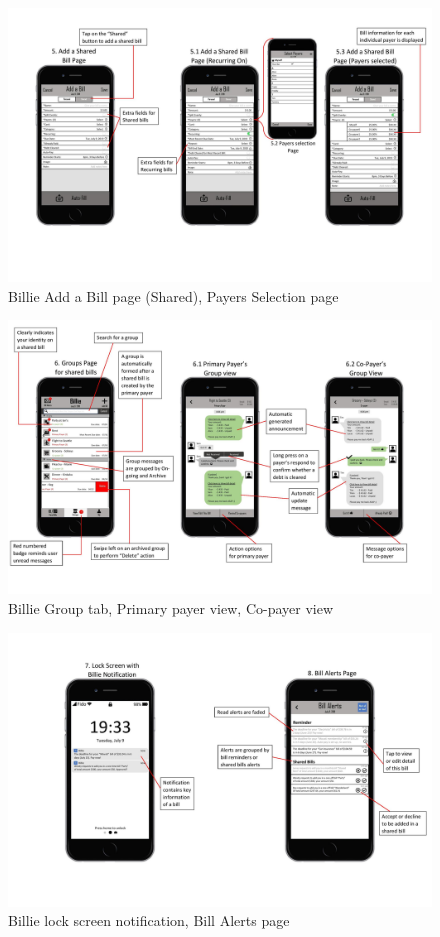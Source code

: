 \documentclass{sigchi}
\begin{document}
 \begin{figure}[htbp!]
\centering
  \includegraphics[width=1\columnwidth]{User-flow-page-004.jpg}
  \caption{Billie Add a Bill page (Shared), Payers Selection page}
  \label{fig:figure43}
\end{figure} 
 \begin{figure}[htbp!]
\centering
  \includegraphics[width=1\columnwidth]{User-flow-page-005.jpg}
  \caption{Billie Group tab, Primary payer view, Co-payer view}
  \label{fig:figure44}
\end{figure} 
 \begin{figure}[h!]
\centering
  \includegraphics[width=1\columnwidth]{User-flow-page-006.jpg}
  \caption{Billie lock screen notification, Bill Alerts page }
  \label{fig:figure45}
\end{figure} 
\end{document}

